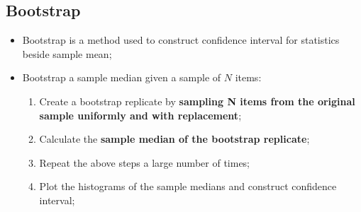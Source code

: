   \subsection{Bootstrap}
  
    \begin{itemize}
      \item Bootstrap is a method used to construct confidence interval for statistics beside sample mean;
      \item Bootstrap a sample median given a sample of $ N $ items:
      \begin{enumerate}
        \item Create a bootstrap replicate by \textbf{sampling N items from the original sample uniformly and with replacement};
        \item Calculate the \textbf{sample median of the bootstrap replicate};
        \item Repeat the above steps a large number of times;
        \item Plot the histograms of the sample medians and construct confidence interval;
      \end{enumerate}
    \end{itemize}